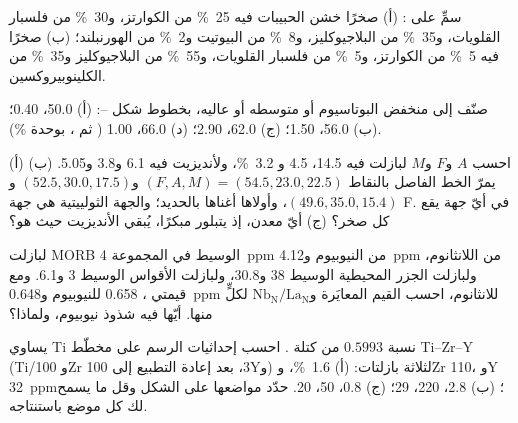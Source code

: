 \begin{exercise}[$\star$]\label{exo:b2:magmatic-series:3}
سمِّ على : (أ) صخرًا خشن الحبيبات فيه \qty{25}{\percent} من الكوارتز،
و\qty{30}{\percent} من فلسبار القلويات، و\qty{35}{\percent} من البلاجيوكليز، و\qty{8}{\percent} من
البيوتيت و\qty{2}{\percent} من الهورنبلند؛ (ب) صخرًا فيه \qty{5}{\percent} من الكوارتز،
و\qty{5}{\percent} من فلسبار القلويات، و\qty{55}{\percent} من البلاجيوكليز
و\qty{35}{\percent} من الكلينوبيروكسين.
\end{exercise}

\begin{exercise}[$\star$]\label{exo:b2:magmatic-series:4}
صنّف إلى منخفض البوتاسيوم أو متوسطه أو عاليه، بخطوط شكل --:
(أ) 50.0، 0.40؛ (ب) 56.0، 1.50؛ (ج) 62.0، 2.90؛ (د) 66.0، 1.00 ( ثم
، بوحدة \unit{\percent}).
\end{exercise}

\begin{exercise}[$\star\star$]\label{exo:b2:magmatic-series:5}
(أ) احسب $A$ و$F$ و$M$ لبازلت فيه  14.5،  4.5
و \qty{3.2}{\percent}، ولأنديزيت فيه 6.1 و3.8 و5.05.
(ب) يمرّ الخط الفاصل بالنقاط $(F, A, M) = (54.5, 23.0, 22.5)$ و$(52.5, 30.0,
17.5)$ و$(49.6, 35.0, 15.4)$، وأولاها أغناها بالحديد؛
والجهة الثولييتية هي جهة F. في أيّ جهة يقع كل صخر؟ (ج) أيّ
معدن، إذ يتبلور مبكرًا، يُبقي الأنديزيت حيث هو؟
\end{exercise}

\begin{exercise}[$\star\star$]\label{exo:b2:magmatic-series:6}
لبازلت MORB الوسيط في المجموعة \qty{4}{ppm} من النيوبيوم و\qty{4.12}{ppm} من اللانثانوم،
ولبازلت الجزر المحيطية الوسيط 38 و30.8، ولبازلت الأقواس الوسيط 3 و6.1. ومع
قيمتي ، 0.658 للنيوبيوم و\qty{0.648}{ppm} للانثانوم، احسب القيم المعايَرة
و$\mathrm{Nb_N}/\mathrm{La_N}$ لكلٍّ منها. أيّها فيه شذوذ نيوبيوم، ولماذا؟
\end{exercise}

\begin{exercise}[$\star\star$]\label{exo:b2:magmatic-series:7}
يساوي Ti نسبة $0.5993$ من كتلة . احسب إحداثيات الرسم على مخطّط Ti--Zr--Y
(Ti/100 وZr و$3\mathrm Y$، بعد إعادة التطبيع إلى 100) لثلاثة بازلتات: (أ) 
\qty{1.6}{\percent}، وZr 110، وY \qty{32}{ppm}؛ (ب) 2.8، 220، 29؛ (ج) 0.8، 50، 20. حدّد
مواضعها على الشكل وقل ما يسمح لك كل موضع باستنتاجه.
\end{exercise}

